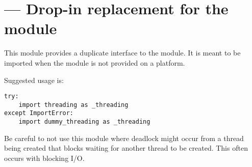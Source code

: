 \section{ ---
         Drop-in replacement for the  module}


This module provides a duplicate interface to the
 module.  It is meant to be imported when the
 module is not provided on a platform.

Suggested usage is:

\begin{verbatim}
try:
    import threading as _threading
except ImportError:
    import dummy_threading as _threading
\end{verbatim}

Be careful to not use this module where deadlock might occur from a thread 
being created that blocks waiting for another thread to be created.  This 
often occurs with blocking I/O.
